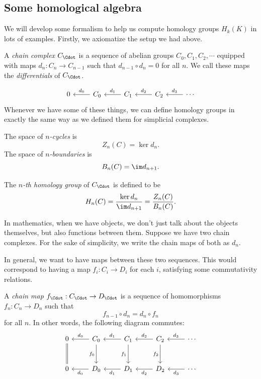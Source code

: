 \documentclass[a4paper]{article}
\begin{document}
\subsection{Some homological algebra}
We will develop some formalism to help us compute homology groups $H_k(K)$ in lots of examples. Firstly, we axiomatize the setup we had above.
\begin{defi}
  A \emph{chain complex} $C_{\Cdot}$ is a sequence of abelian groups $C_0, C_1, C_2, \cdots$ equipped with maps $d_n: C_n \to C_{n - 1}$ such that $d_{n - 1} \circ d_n = 0$ for all $n$. We call these maps the \emph{differentials} of $C_{\Cdot}$.
\end{defi}
\[
  \begin{tikzcd}
    0 & C_0 \ar[l, "d_0"'] & C_1 \ar [l, "d_1"'] & C_2 \ar [l, "d_2"'] & \cdots \ar [l, "d_3"']
  \end{tikzcd}
\]
Whenever we have some of these things, we can define homology groups in exactly the same way as we defined them for simplicial complexes.

\begin{defi}
  The space of \emph{$n$-cycles} is
  \[
    Z_n(C) = \ker d_n.
  \]
  The space of \emph{$n$-boundaries} is
  \[
    B_n(C) = \im d_{n+1}.
  \]
\end{defi}

\begin{defi}
  The \emph{$n$-th homology group} of $C_{\Cdot}$ is defined to be
  \[
    H_n(C) = \frac{\ker d_n}{\im d_{n + 1}} = \frac{Z_n(C)}{B_n(C)}.
  \]
\end{defi}

In mathematics, when we have objects, we don't just talk about the objects themselves, but also functions between them. Suppose we have two chain complexes. For the sake of simplicity, we write the chain maps of both as $d_n$.

In general, we want to have maps between these two sequences. This would correspond to having a map $f_i: C_i \to D_i$ for each $i$, satisfying some commutativity relations.

\begin{defi}
  A \emph{chain map} $f_{\Cdot}: C_{\Cdot}\to D_{\Cdot}$ is a sequence of homomorphisms $f_n: C_n \to D_n$ such that
  \[
    f_{n - 1} \circ d_n = d_n \circ f_n
  \]
  for all $n$. In other words, the following diagram commutes:
  \[
    \begin{tikzcd}[row sep=large]
      0 \ar[d, equals] & C_0 \ar[l, "d_0"'] \ar[d, "f_0"'] & C_1 \ar [l, "d_1"'] \ar[d, "f_1"'] & C_2 \ar [l, "d_2"'] \ar [d, "f_2"'] & \cdots \ar [l, "d_3"']\\
      0 & D_0 \ar[l, "d_0"] & D_1 \ar [l, "d_1"] & D_2 \ar [l, "d_2"] & \cdots \ar [l, "d_3"]
    \end{tikzcd}
  \]
\end{defi}
\end{document}
